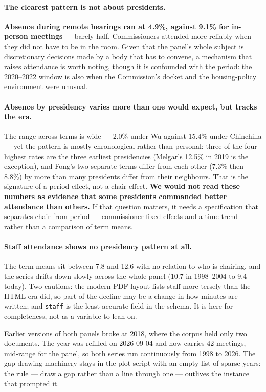 \documentclass[11pt]{article}
\begin{document}
\paragraph{The clearest pattern is not about presidents.} \textbf{Absence during remote
hearings ran at 4.9\%, against 9.1\% for in-person meetings} --- barely half. Commissioners
attended more reliably when they did not have to be in the room. Given that the panel's
whole subject is discretionary decisions made by a body that has to convene, a mechanism
that raises attendance is worth noting, though it is confounded with the period: the
2020--2022 window is also when the Commission's docket and the housing-policy environment
were unusual.

\paragraph{Absence by presidency varies more than one would expect, but tracks the era.}
The range across terms is wide --- 2.0\% under Wu against 15.4\% under Chinchilla --- yet
the pattern is mostly chronological rather than personal: three of the four highest rates
are the three earliest presidencies (Melgar's 12.5\% in 2019 is the exception), and Fong's
two separate terms differ from each other (7.3\% then 8.8\%) by more than many presidents
differ from their neighbours. That is the signature of a
period effect, not a chair effect. \textbf{We would not read these numbers as evidence that
some presidents commanded better attendance than others.} If that question matters, it needs
a specification that separates chair from period --- commissioner fixed effects and a time
trend --- rather than a comparison of term means.

\paragraph{Staff attendance shows no presidency pattern at all.} The term means sit between
7.8 and 12.6 with no relation to who is chairing, and the series drifts down slowly across
the whole panel (10.7 in 1998--2004 to 9.4 today). Two cautions: the modern PDF layout lists
staff more tersely than the HTML era did, so part of the decline may be a change in how
minutes are written; and \texttt{staff} is the least accurate field in the schema. It is
here for completeness, not as a variable to lean on.

\medskip\noindent
Earlier versions of both panels broke at 2018, where the corpus held only two documents. The
year was refilled on 2026-09-04 and now carries 42 meetings, mid-range for the panel, so
both series run continuously from 1998 to 2026. The gap-drawing machinery stays in the plot
script with an empty list of sparse years: the rule --- draw a gap rather than a line
through one --- outlives the instance that prompted it.
\end{document}

